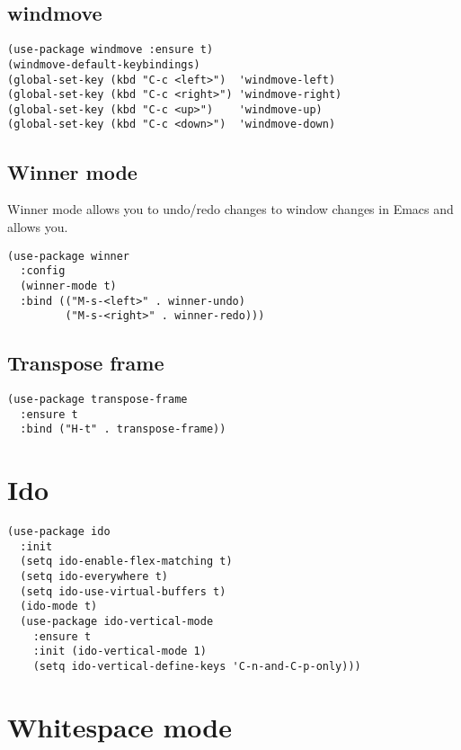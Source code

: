 \documentclass[11pt]{article}
\begin{document}
\subsection{windmove}
\label{sec-14-1}

\begin{verbatim}
(use-package windmove :ensure t)
(windmove-default-keybindings)
(global-set-key (kbd "C-c <left>")  'windmove-left)
(global-set-key (kbd "C-c <right>") 'windmove-right)
(global-set-key (kbd "C-c <up>")    'windmove-up)
(global-set-key (kbd "C-c <down>")  'windmove-down)
\end{verbatim}
\subsection{Winner mode}
\label{sec-14-2}

Winner mode allows you to undo/redo changes to window changes in Emacs
and allows you.

\begin{verbatim}
(use-package winner
  :config
  (winner-mode t)
  :bind (("M-s-<left>" . winner-undo)
         ("M-s-<right>" . winner-redo)))
\end{verbatim}

\subsection{Transpose frame}
\label{sec-14-3}

\begin{verbatim}
(use-package transpose-frame
  :ensure t
  :bind ("H-t" . transpose-frame))
\end{verbatim}

\section{Ido}
\label{sec-15}

\begin{verbatim}
(use-package ido
  :init
  (setq ido-enable-flex-matching t)
  (setq ido-everywhere t)
  (setq ido-use-virtual-buffers t)
  (ido-mode t)
  (use-package ido-vertical-mode
    :ensure t
    :init (ido-vertical-mode 1)
    (setq ido-vertical-define-keys 'C-n-and-C-p-only)))
\end{verbatim}

\section{Whitespace mode}
\label{sec-16}
\end{document}
